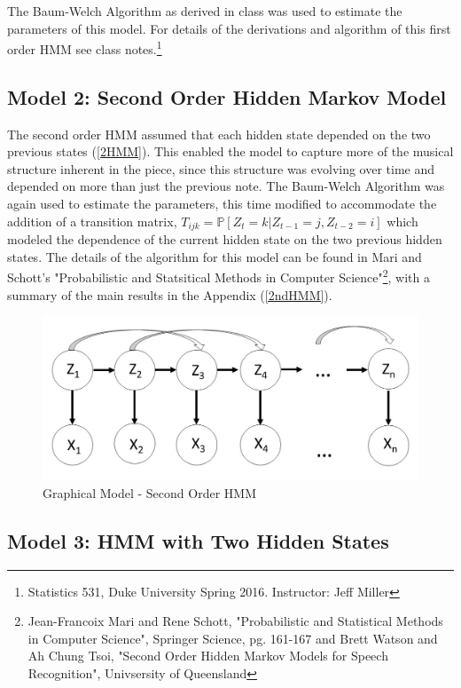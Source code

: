 \documentclass{article} %
\begin{document}
The Baum-Welch Algorithm as derived in class was used to estimate the parameters of this model. For details of the derivations and algorithm of this first order HMM see class notes.\footnote{Statistics 531, Duke University Spring 2016. Instructor: Jeff Miller}
 
\subsection{Model 2: Second Order Hidden Markov Model}

The second order HMM assumed that each hidden state  depended on the two previous  states (\autoref{2HMM}). This enabled the model to capture more of the musical structure inherent in the piece, since this structure was evolving over time and depended on more than just the previous note. The Baum-Welch Algorithm was again used to estimate the parameters, this time modified to accommodate the addition of a transition matrix, $T_{ijk} = \mathbb{P}[Z_t = k | Z_{t-1} = j, Z_{t-2} = i]$ which modeled the dependence of the current hidden state on the two previous hidden states. The details of the algorithm for this model can be found in Mari and Schott's "Probabilistic and Statsitical Methods in Computer Science"\footnote{Jean-Francoix Mari and Rene Schott, "Probabilistic and Statistical Methods in Computer Science", Springer Science, pg. 161-167 and Brett Watson and Ah Chung Tsoi, "Second Order Hidden Markov Models for Speech Recognition", Univsersity of Queensland}, with a summary of the main results in the Appendix (\autoref{2ndHMM}).

\begin{figure}[H]
\centering

\includegraphics [scale = 0.35] {Model2.jpg}
\caption{Graphical Model - Second Order HMM\label{2HMM}}
\end{figure}

\subsection{Model 3: HMM with Two Hidden States}
\end{document}
